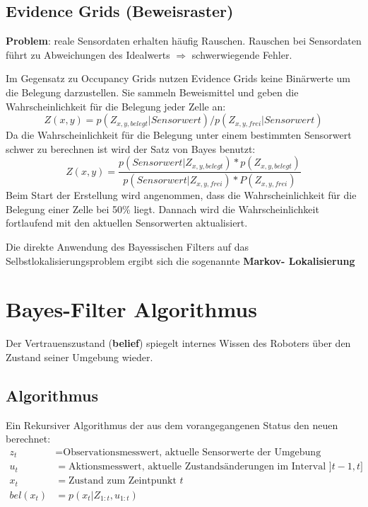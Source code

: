 \subsection{Evidence Grids (Beweisraster)}
\textbf{Problem}: reale Sensordaten erhalten häufig Rauschen.
Rauschen bei  Sensordaten führt zu Abweichungen des Idealwerts $\Rightarrow$
schwerwiegende Fehler.

Im Gegensatz zu Occupancy Grids nutzen Evidence Grids keine Binärwerte um die
Belegung darzustellen. Sie sammeln Beweismittel und geben die
Wahrscheinlichkeit für die Belegung jeder Zelle an:
$$
	Z(x,y) = p(Z_{x,y,belegt} | Sensorwert) / p(Z_{x,y,frei} | Sensorwert)
$$
Da die Wahrscheinlichkeit für die Belegung unter einem bestimmten Sensorwert
schwer zu berechnen ist wird der Satz von Bayes benutzt:
$$
	Z(x,y) = \frac{p(Sensorwert | Z_{x,y,belegt}) * p(Z_{x,y,belegt})}
								{p(Sensorwert | Z_{x,y,frei}) * P(Z_{x,y,frei})}
$$
Beim Start der Erstellung wird angenommen, dass die Wahrscheinlichkeit für die
Belegung einer Zelle bei 50\% liegt. Dannach wird die Wahrscheinlichkeit
fortlaufend mit den aktuellen Sensorwerten aktualisiert.

Die direkte Anwendung des Bayessischen Filters auf das
Selbstlokalisierungsproblem ergibt sich die sogenannte \textbf{Markov-
Lokalisierung}

\section{Bayes-Filter Algorithmus}
Der Vertrauenszustand (\textbf{belief}) spiegelt internes Wissen des Roboters
über den Zustand seiner Umgebung wieder.

\subsection{Algorithmus}
Ein Rekursiver Algorithmus der aus dem vorangegangenen Status den neuen
berechnet:
\begin{align*}
	z_t &= \text{Observationsmesswert, aktuelle Sensorwerte der Umgebung} \\
	u_t &= \text{Aktionsmesswert, aktuelle Zustandsänderungen im Interval }
		]t-1, t] \\
	x_t &= \text{Zustand zum Zeintpunkt }t \\
	bel(x_t) &= p(x_t | Z_{1:t}, u_{1:t}) \\
\end{align*}


